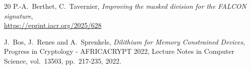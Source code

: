 \documentclass{llncs}
\begin{document}
\begin{thebibliography}{20}
P.-A.~Berthet, C.~Tavernier,
\emph{Improving the masked division for the FALCON signature},\\
\url{https://eprint.iacr.org/2025/628}



J.~Bos, J.~Renes and A.~Sprenkels,
\emph{Dilithium for Memory Constrained Devices},
Progress in Cryptology - AFRICACRYPT 2022, Lecture Notes in Computer
Science, vol.~13503, pp.~217-235, 2022.









\end{thebibliography}
\end{document}
